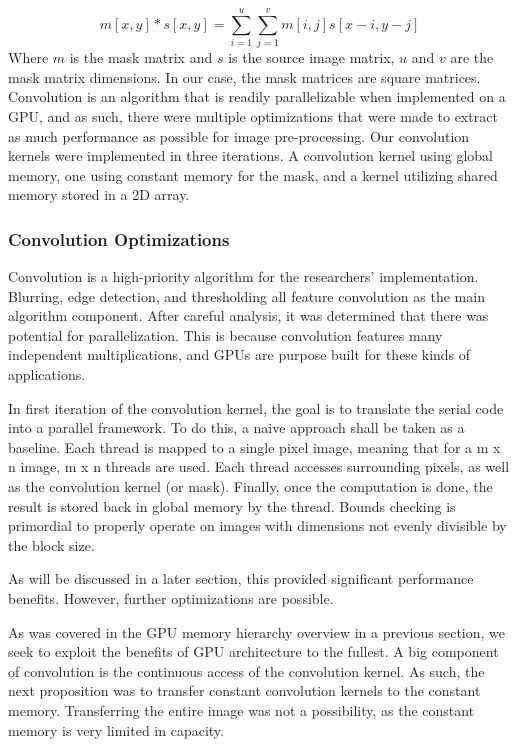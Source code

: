 \documentclass[12pt]{article}
\begin{document}
\begin{equation}
  m[x,y] * s[x,y] = \sum\limits_{i = 1}^{u} \sum\limits_{j = 1}^{v} m[i,j]s[x-i, y-j]
  \label{equation:convolution}
\end{equation}
Where $m$ is the mask matrix and $s$ is the source image matrix, $u$ and $v$ are the mask matrix dimensions. In our case, the mask matrices are square matrices.
Convolution is an algorithm that is readily parallelizable when implemented on a GPU, and as such, there were multiple optimizations that were made to extract as much performance as possible for image pre-processing.
Our convolution kernels were implemented in three iterations. 
A convolution kernel using global memory, one using constant memory for the mask, and a kernel utilizing shared memory stored in a 2D array.

\subsubsection*{Convolution Optimizations}
\noindent
Convolution is a high-priority algorithm for the researchers' implementation.
Blurring, edge detection, and thresholding all feature convolution as the main algorithm component.
After careful analysis, it was determined that there was potential  for parallelization.
This is because convolution features many independent multiplications, and GPUs are purpose built for these kinds of applications.

In first iteration of the convolution kernel, the goal is to translate the serial code into a parallel framework.
To do this, a naive approach shall be taken as a baseline.
Each thread is mapped to a single pixel image, meaning that for a m x n image, m x n threads are used.
Each thread accesses surrounding pixels, as well as the convolution kernel (or mask).
Finally, once the computation is done, the result is stored back in global memory by the thread.
Bounds checking is primordial to properly operate on images with dimensions not evenly divisible by the block size.

As will be discussed in a later section, this provided significant performance benefits.
However, further optimizations are possible.

As was covered in the GPU memory hierarchy overview in a previous section, we seek to exploit the benefits of GPU architecture to the fullest.
A big component of convolution is the continuous access of the convolution kernel.
As such, the next proposition was to transfer constant convolution kernels to the constant memory.
Transferring the entire image was not a possibility, as the constant memory is very limited in capacity.
\end{document}
